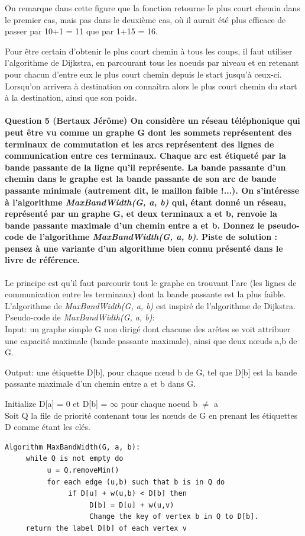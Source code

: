 \documentclass[a4paper]{article}
\begin{document}
On remarque dans cette figure que la fonction retourne le plus court chemin dans le premier cas, mais pas dans le deuxième cas, où il aurait été plus efficace de passer par 10+1 = 11 que par 1+15 = 16. 

Pour être certain d'obtenir le plus court chemin à tous les coups, il faut utiliser l'algorithme de Dijkstra, en parcourant tous les noeuds par niveau et en retenant pour chacun d'entre eux le plus court chemin depuis le start jusqu'à ceux-ci. Lorsqu'on arrivera à destination on connaîtra alors le plus court chemin du start à la destination, ainsi que son poids.
\paragraph{Question 5 (Bertaux Jérôme) On considère un réseau téléphonique qui peut être vu comme un graphe G dont les sommets représentent des terminaux de commutation et les arcs représentent des lignes de communication entre ces terminaux. Chaque arc est étiqueté par la bande passante de la ligne qu’il représente. La bande passante d’un chemin dans le graphe est la bande passante de son arc de bande passante minimale (autrement dit, le maillon faible !...). On s'intéresse à l’algorithme \textit{MaxBandWidth(G, a, b)} qui, étant donné un réseau, représenté par un graphe G, et deux terminaux a et b, renvoie la bande passante maximale d’un chemin entre a et b. Donnez le pseudo- code de l’algorithme \textit{MaxBandWidth(G, a, b)}. Piste de solution : pensez à une variante d’un algorithme bien connu présenté dans le livre de référence.}

Le principe est qu'il faut parcourir tout le graphe en trouvant l'arc (les lignes de communication entre les terminaux) dont la bande passante est la plus faible. L'algorithme de \textit{MaxBandWidth(G, a, b)} est inspiré de l'algorithme de Dijkstra.\\

Pseudo-code de \textit{MaxBandWidth(G, a, b)}:\\
     Input: un graphe simple G non dirigé dont chacune des arêtes se voit attribuer une capacité maximale (bande passante maximale), ainsi que deux nœuds a,b de G.
	 
     Output: une étiquette D[b], pour chaque nœud b de G, tel que D[b] est la bande passante maximale d’un chemin entre a et b dans G.
      
      Initialize D[a] = 0 et D[b] =  $\infty$ pour chaque noeud b $\neq$ a\\
      Soit Q la file de priorité contenant tous les nœuds de G en prenant les étiquettes D comme étant les clés.
\begin{verbatim}
Algorithm MaxBandWidth(G, a, b):
     while Q is not empty do
          u = Q.removeMin()
          for each edge (u,b) such that b is in Q do
               if D[u] + w(u,b) < D[b] then
                    D[b] = D[u] + w(u,v)
                    Change the key of vertex b in Q to D[b].
     return the label D[b] of each vertex v
\end{verbatim}
\end{document}
